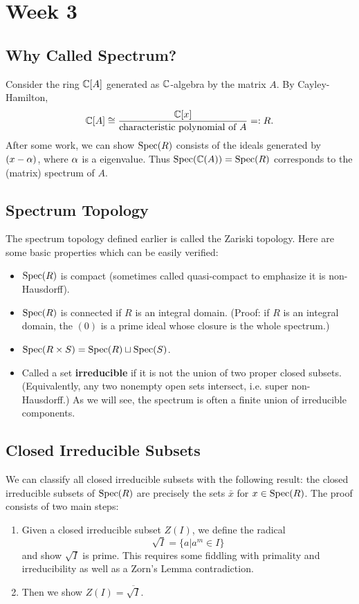 \section{Week 3}

\subsection{Why Called Spectrum?}
Consider the ring ${\mathbb C}[A]$ generated as ${\mathbb C}$-algebra by the matrix $A$. By Cayley-Hamilton,
\[
    {\mathbb C}[A] \cong \frac{{\mathbb C}[x]}{\text{characteristic polynomial of } A} =: R.
\]
After some work, we can show $\operatorname{Spec}(R)$ consists of the ideals generated by $(x - \alpha)$, where $\alpha$ is a eigenvalue. Thus $\operatorname{Spec}({\mathbb C}(A)) = \operatorname{Spec}(R)$ corresponds to the (matrix) spectrum of $A$.

\subsection{Spectrum Topology}
The spectrum topology defined earlier is called the Zariski topology. Here are some basic properties which can be easily verified:
\begin{itemize}
    \item $\operatorname{Spec}(R)$ is compact (sometimes called quasi-compact to emphasize it is non-Hausdorff).
    \item $\operatorname{Spec}(R)$ is connected if $R$ is an integral domain. (Proof: if $R$ is an integral domain, the $(0)$ is a prime ideal whose closure is the whole spectrum.)
    \item $\operatorname{Spec}(R \times S) = \operatorname{Spec}(R) \sqcup \operatorname{Spec}(S)$.
    \item Called a set \textbf{irreducible} if it is not the union of two proper closed subsets. (Equivalently, any two nonempty open sets intersect, i.e. super non-Hausdorff.) As we will see, the spectrum is often a finite union of irreducible components.
\end{itemize}

\subsection{Closed Irreducible Subsets}
We can classify all closed irreducible subsets with the following result: the closed irreducible subsets of $\operatorname{Spec}(R)$ are precisely the sets $\bar{x}$ for $x \in \operatorname{Spec}(R)$. The proof consists of two main steps:
\begin{enumerate}
    \item Given a closed irreducible subset $Z(I)$, we define the radical
    \[
        \sqrt{I} = \{a | a^m \in I\}
    \]
    and show $\sqrt{I}$ is prime. This requires some fiddling with primality and irreducibility as well as a Zorn's Lemma contradiction.
    \item Then we show $Z(I) = \overline{\sqrt{I}}$.
\end{enumerate}

